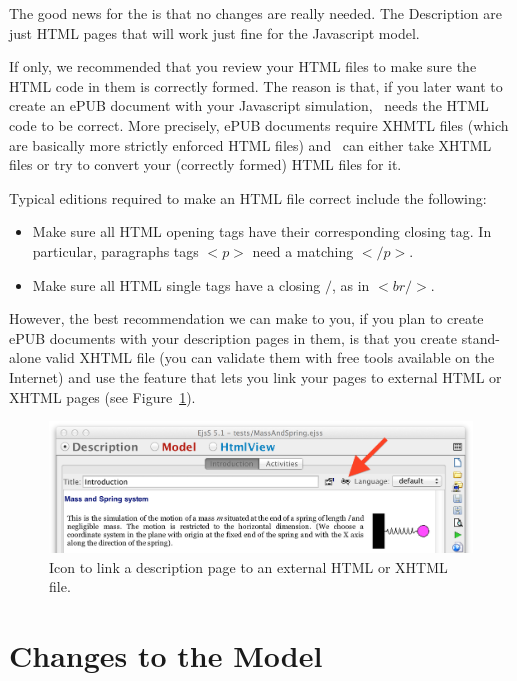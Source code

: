 The good news for the  is that no changes are really needed. The Description are just HTML pages that will work just fine for the Javascript model.

If only, we recommended that you review your HTML files to make sure the HTML code in them is correctly formed. The reason is that, if you later want to create an ePUB document with your Javascript simulation, \ejs\ needs the HTML code to be correct. More precisely, ePUB documents require XHMTL files (which are basically more strictly enforced HTML files) and \ejs\ can either take XHTML files or try to convert your (correctly formed) HTML files for it.

Typical editions required to make an HTML file correct include the following:

\begin{itemize}
  \item Make sure all HTML opening tags have their corresponding closing tag. In particular, paragraphs tags $<p>$ need a matching  $</p>$.
  \item Make sure all HTML single tags have a closing $/$, as in $<br />$.
\end{itemize}
\noindent However, the best recommendation we can make to you, if you plan to create ePUB documents with your description pages in them, is that you create stand-alone valid XHTML file (you can validate them with free tools available on the Internet) and use the  feature that lets you link your pages to external HTML or XHTML pages (see Figure~\ref{fig:04JavatoJS/LinkHTMLPage}).

\begin{figure}[htb]
  \centering
  \includegraphics[scale=\scale]{04JavatoJS/images/LinkHTMLPage.png}
  \caption{Icon to link a description page to an external HTML or XHTML file.}
  \label{fig:04JavatoJS/LinkHTMLPage}
\end{figure}

    \section{Changes to the Model}\label{section:04Model}

